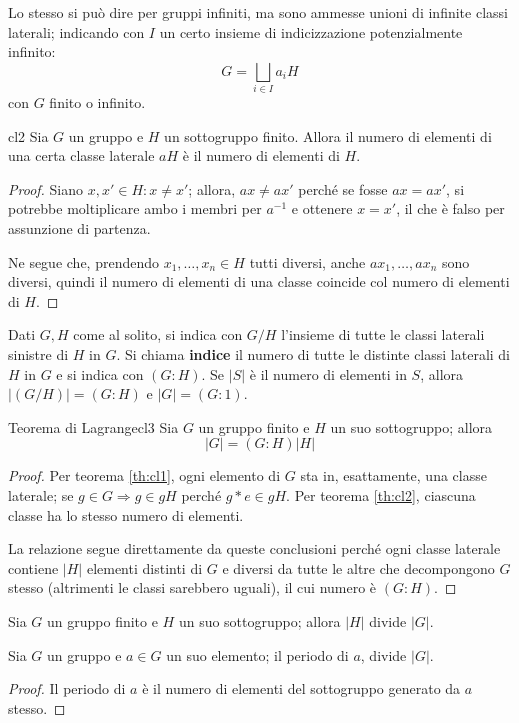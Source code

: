 \documentclass[11pt, a4paper]{scrartcl}
\theoremstyle{definition}
\numberwithin{esempio}{section}
\theoremstyle{definition}
\numberwithin{obs}{section}
\numberwithin{nota}{section}
\numberwithin{equation}{subsection}
\begin{document}
Lo stesso si pu\`o dire per gruppi infiniti, ma sono ammesse unioni di infinite classi laterali; indicando con $I$ un certo insieme di indicizzazione potenzialmente infinito:
\begin{equation}
	G = \bigsqcup _{i \in I} a _i H
\end{equation}
con $G$ finito o infinito.
\begin{teorema}
	{}{cl2}
	Sia $G$ un gruppo e $H$ un sottogruppo finito. Allora il numero di elementi di una certa classe laterale $aH$ \`e il numero di elementi di $H$.
	\begin{proof}
		Siano $x,x' \in H : x\neq x'$; allora, $ax \neq ax'$ perch\'e se fosse $ax=ax'$, si potrebbe moltiplicare ambo i membri per $a^{-1} $ e ottenere $x=x'$, il che \`e falso per assunzione di partenza.

		Ne segue che, prendendo $x_1,\ldots,x_n \in H$ tutti diversi, anche $ax_1, \ldots, ax_n$ sono diversi, quindi il numero di elementi di una classe coincide col numero di elementi di $H$.
	\end{proof}
\end{teorema}
Dati $G,H$ come al solito, si indica con $G/H$ l'insieme di tutte le classi laterali sinistre di $H$ in $G$.
Si chiama \textbf{indice} il numero di tutte le distinte classi laterali di $H$ in $G$ e si indica con $(G:H)$.
Se $|S|$ \`e il numero di elementi in $S$, allora $| (G / H) |= (G:H)$ e $|G| = (G:1)$.
\begin{teorema}
	{Teorema di Lagrange}{cl3}
	Sia $G$ un gruppo finito e $H$ un suo sottogruppo; allora 
	\[
	|G| = (G:H) |H|
	\] 
\begin{proof}
		Per teorema \ref{th:cl1}, ogni elemento di $G$ sta in, esattamente, una classe laterale; se $g \in G \Rightarrow g \in gH$ perch\'e $g*e \in gH$.
		Per teorema \ref{th:cl2}, ciascuna classe ha lo stesso numero di elementi.

		La relazione segue direttamente da queste conclusioni perch\'e ogni classe laterale contiene $|H|$ elementi distinti di $G$ e diversi da tutte le altre che decompongono $G$ stesso (altrimenti le classi sarebbero uguali), il cui numero \`e $(G:H)$.
\end{proof}	
\end{teorema}
\begin{corollario}
	{}{}
	Sia $G$ un gruppo finito e $H$ un suo sottogruppo; allora $|H|$ divide $|G|$.	
\end{corollario}
\begin{corollario}
	{}{}
	Sia $G$ un gruppo e $a \in G$ un suo elemento; il periodo di $a$, divide $|G|$.
	\begin{proof}
		Il periodo di $a$ \`e il numero di elementi del sottogruppo generato da $a$ stesso.
	\end{proof}
\end{corollario}
\end{document}
